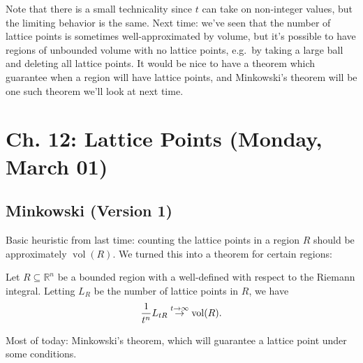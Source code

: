 \begin{remark}

Note that there is a small technicality since \(t\) can take on
non-integer values, but the limiting behavior is the same. Next time:
we've seen that the number of lattice points is sometimes
well-approximated by volume, but it's possible to have regions of
unbounded volume with no lattice points, e.g.~by taking a large ball and
deleting all lattice points. It would be nice to have a theorem which
guarantee when a region will have lattice points, and Minkowski's
theorem will be one such theorem we'll look at next time.

\end{remark}

\hypertarget{ch.-12-lattice-points-monday-march-01}{%
\section{Ch. 12: Lattice Points (Monday, March
01)}\label{ch.-12-lattice-points-monday-march-01}}

\hypertarget{minkowski-version-1}{%
\subsection{Minkowski (Version 1)}\label{minkowski-version-1}}

\begin{remark}

Basic heuristic from last time: counting the lattice points in a region
\(R\) should be approximately \(\operatorname{vol}(R)\). We turned this
into a theorem for certain regions:

\end{remark}

\begin{theorem}[?]

Let \(R \subseteq {\mathbb{R}}^n\) be a bounded region with a
well-defined with respect to the Riemann integral. Letting \(L_{R}\) be
the number of lattice points in \(R\), we have
\begin{align*}
{1\over t^n} L_{tR} \overset{t\to \infty}\to \operatorname{vol}(R)
.\end{align*}

\end{theorem}

\begin{remark}

Most of today: Minkowski's theorem, which will guarantee a lattice point
under some conditions.

\end{remark}

